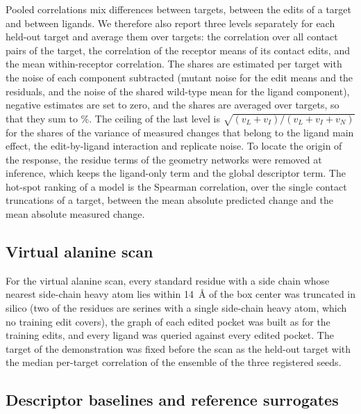 Pooled correlations mix differences between targets, between the edits of a target and between ligands. We therefore also report three levels separately for each held-out target and average them over targets: the correlation over all contact pairs of the target, the correlation of the receptor means of its contact edits, and the mean within-receptor correlation. The shares are estimated per target with the noise of each component subtracted (mutant noise for the edit means and the residuals, and the noise of the shared wild-type mean for the ligand component), negative estimates are set to zero, and the shares are averaged over targets, so that they sum to \shareSum{}\%. The ceiling of the last level is $\sqrt{(v_L + v_I)/(v_L + v_I + v_N)}$ for the shares of the variance of measured changes that belong to the ligand main effect, the edit-by-ligand interaction and replicate noise. To locate the origin of the response, the residue terms of the geometry networks were removed at inference, which keeps the ligand-only term and the global descriptor term. The hot-spot ranking of a model is the Spearman correlation, over the single contact truncations of a target, between the mean absolute predicted change and the mean absolute measured change.

\subsection{Virtual alanine scan}

For the virtual alanine scan, every standard residue with a side chain whose nearest side-chain heavy atom lies within 14~\AA{} of the box center was truncated in silico (two of the residues are serines with a single side-chain heavy atom, which no training edit covers), the graph of each edited pocket was built as for the training edits, and every ligand was queried against every edited pocket. The target of the demonstration was fixed before the scan as the held-out target with the median per-target correlation of the ensemble of the three registered seeds.

\subsection{Descriptor baselines and reference surrogates}

